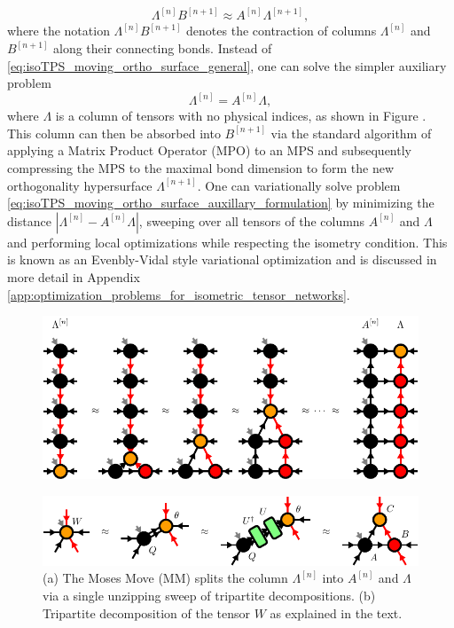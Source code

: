 \begin{equation}
	\label{eq:isoTPS_moving_ortho_surface_general}
	\Lambda^{[n]} B^{[n+1]} \approx A^{[n]} \Lambda^{[n+1]},
\end{equation}
where the notation $\Lambda^{[n]} B^{[n+1]}$ denotes the contraction of columns $\Lambda^{[n]}$ and $B^{[n+1]}$ along their connecting bonds. Instead of \eqref{eq:isoTPS_moving_ortho_surface_general}, one can solve the simpler auxiliary problem
\begin{equation}
	\label{eq:isoTPS_moving_ortho_surface_auxillary_formulation}
	\Lambda^{[n]} = A^{[n]} \Lambda,
\end{equation}
where $\Lambda$ is a column of tensors with no physical indices, as shown in Figure . This column can then be absorbed into $B^{[n+1]}$ via the standard algorithm of applying a Matrix Product Operator (MPO) to an MPS and subsequently compressing the MPS to the maximal bond dimension \cite{cite:DMRG_in_the_age_of_MPS} to form the new orthogonality hypersurface $\Lambda^{[n+1]}$. One can variationally solve problem \eqref{eq:isoTPS_moving_ortho_surface_auxillary_formulation} by minimizing the distance $\left\lvert\Lambda^{[n]}-A^{[n]}\Lambda\right\rvert$, sweeping over all tensors of the columns $A^{[n]}$ and $\Lambda$ and performing local optimizations while respecting the isometry condition. This is known as an Evenbly-Vidal style variational optimization and is discussed in more detail in Appendix \ref{app:optimization_problems_for_isometric_tensor_networks}.
\begin{figure}
	\centering
	\subcaptionbox{\label{fig:Moses_move}}
	{%
		\includegraphics[scale=1]{figures/tikz/Tensor_Networks/isoTPS_MM/isoTPS_MM_a.pdf}
	}
	\par\medskip
	\subcaptionbox{\label{fig:tripartite_decomposition}}
	{%
		\includegraphics[scale=1]{figures/tikz/Tensor_Networks/isoTPS_MM/isoTPS_MM_b.pdf}
		
	}
	\caption{(a) The Moses Move (MM) splits the column $\Lambda^{[n]}$ into $A^{[n]}$ and $\Lambda$ via a single unzipping sweep of tripartite decompositions. (b) Tripartite decomposition of the tensor $W$ as explained in the text.}
	\label{fig:Moses_move_and_tripartite_decomposition}
\end{figure}

